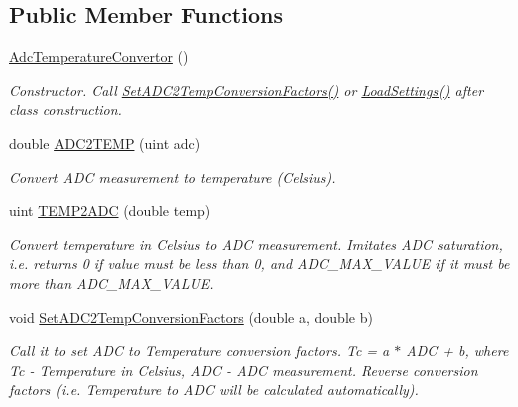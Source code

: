 \subsection*{Public Member Functions}
\begin{DoxyCompactItemize}
\item 
\mbox{\label{class_adc_temperature_convertor_a3a78f66052068b96ace348d55e54d05c}} 
\hyperlink{class_adc_temperature_convertor_a3a78f66052068b96ace348d55e54d05c}{Adc\+Temperature\+Convertor} ()
\begin{DoxyCompactList}\small\item\em Constructor. Call \hyperlink{class_adc_temperature_convertor_a5a19355f805554763e914e5b2216d5f6}{Set\+A\+D\+C2\+Temp\+Conversion\+Factors()} or \hyperlink{class_adc_temperature_convertor_affab0a66a3508e2eedd8bab3407ae80f}{Load\+Settings()} after class construction. \end{DoxyCompactList}\item 
double \hyperlink{class_adc_temperature_convertor_a3ee4549435400d9ed319fd5fdb83c97f}{A\+D\+C2\+T\+E\+MP} (uint adc)
\begin{DoxyCompactList}\small\item\em Convert A\+DC measurement to temperature (Celsius). \end{DoxyCompactList}\item 
uint \hyperlink{class_adc_temperature_convertor_ae82f374826a431c837bdf796c593775b}{T\+E\+M\+P2\+A\+DC} (double temp)
\begin{DoxyCompactList}\small\item\em Convert temperature in Celsius to A\+DC measurement. Imitates A\+DC saturation, i.\+e. returns 0 if value must be less than 0, and A\+D\+C\+\_\+\+M\+A\+X\+\_\+\+V\+A\+L\+UE if it must be more than A\+D\+C\+\_\+\+M\+A\+X\+\_\+\+V\+A\+L\+UE. \end{DoxyCompactList}\item 
void \hyperlink{class_adc_temperature_convertor_a5a19355f805554763e914e5b2216d5f6}{Set\+A\+D\+C2\+Temp\+Conversion\+Factors} (double a, double b)
\begin{DoxyCompactList}\small\item\em Call it to set A\+DC to Temperature conversion factors. Tc = a $\ast$ A\+DC + b, where Tc -\/ Temperature in Celsius, A\+DC -\/ A\+DC measurement. Reverse conversion factors (i.\+e. Temperature to A\+DC will be calculated automatically). \end{DoxyCompactList}\item 

\end{DoxyCompactItemize}
